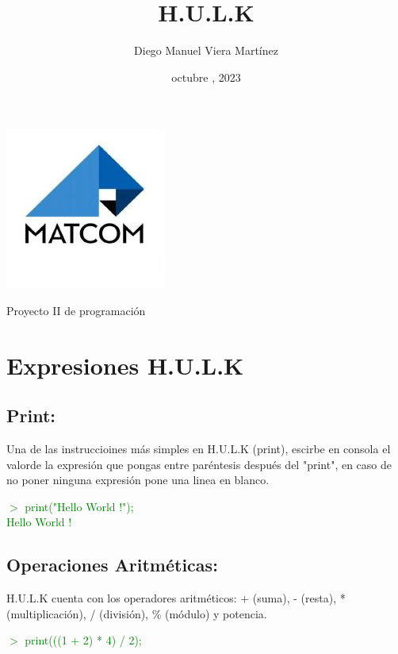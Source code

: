 \documentclass[a4paper,12pt]{article}
\begin{document}
\color{white}
\pagecolor{black}
    \ttfamily
    \title{\huge \textbf{H.U.L.K}}
    \author{Diego Manuel Viera Martínez}
    \date{octubre , 2023}
    \maketitle
    \begin{center}
        \includegraphics[scale=0.7]{Pictures/matcom.jpg}
        \label{fig:logo}
    \end{center}
    \begin{center}
        \large Proyecto II de programación
    \end{center}

    \newpage 
    
    \section{Expresiones H.U.L.K}\label{sec:Expresiones}
    \subsection{Print:}\label{sub:printExpression}
    \begin{center}
        Una de las instruccioines más simples en H.U.L.K (print),
    escirbe en consola el valorde la expresión que pongas entre
    paréntesis después del "print", en caso de no poner ninguna expresión
    pone una linea en blanco.
    \end{center}
    \textcolor{green}{$>$ print("Hello World !");}\\
    \textcolor{green}{Hello World !}
    

    \subsection{Operaciones Aritméticas:}\label{sub:aritmeticsOperations}
    \begin{flushleft}
        H.U.L.K cuenta con los operadores aritméticos: + (suma),  - (resta), 
        * (multiplicación), / (división), \% (módulo) y potencia.
    \end{flushleft}
    \textcolor{green}{$>$ print(((1 + 2) * 4) / 2);}
    
\end{document}
